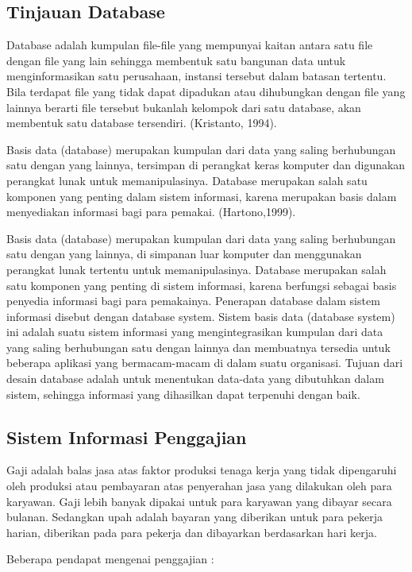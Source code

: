 \documentclass{jtetiproposalskripsi}
\begin{document}
\subsection{Tinjauan Database}
Database adalah kumpulan file-file yang mempunyai kaitan antara satu file dengan file yang lain sehingga membentuk satu bangunan data untuk menginformasikan satu perusahaan, instansi tersebut dalam batasan tertentu. Bila terdapat file yang tidak dapat dipadukan atau dihubungkan dengan file yang lainnya berarti file tersebut bukanlah kelompok dari satu database, akan membentuk satu database tersendiri. (Kristanto, 1994).

Basis data (database) merupakan kumpulan dari data yang saling berhubungan satu dengan yang lainnya, tersimpan di perangkat keras komputer dan digunakan perangkat lunak untuk memanipulasinya. Database merupakan salah satu komponen yang penting dalam sistem informasi, karena merupakan basis dalam menyediakan informasi bagi para pemakai. (Hartono,1999).

Basis data (database) merupakan kumpulan dari data yang saling berhubungan satu dengan yang lainnya, di simpanan luar komputer dan menggunakan perangkat lunak tertentu untuk memanipulasinya. Database merupakan salah  satu komponen yang penting di sistem informasi, karena berfungsi sebagai  basis penyedia informasi bagi para pemakainya. Penerapan database dalam  sistem informasi disebut dengan database system. Sistem basis data (database system) ini adalah suatu sistem informasi yang mengintegrasikan kumpulan dari data yang saling berhubungan satu dengan lainnya dan membuatnya tersedia untuk beberapa aplikasi yang bermacam-macam di dalam  suatu organisasi. Tujuan dari desain database adalah untuk menentukan data-data yang dibutuhkan dalam sistem, sehingga informasi yang dihasilkan dapat terpenuhi dengan baik. 

\subsection{Sistem Informasi Penggajian}
Gaji adalah balas jasa atas faktor produksi tenaga kerja yang tidak dipengaruhi oleh produksi atau pembayaran atas penyerahan jasa yang dilakukan oleh para karyawan. Gaji lebih banyak dipakai untuk para karyawan yang dibayar secara bulanan. Sedangkan upah adalah bayaran yang diberikan untuk para pekerja harian, diberikan pada para pekerja dan dibayarkan berdasarkan hari kerja.

	Beberapa pendapat mengenai penggajian :
	
\end{document}
